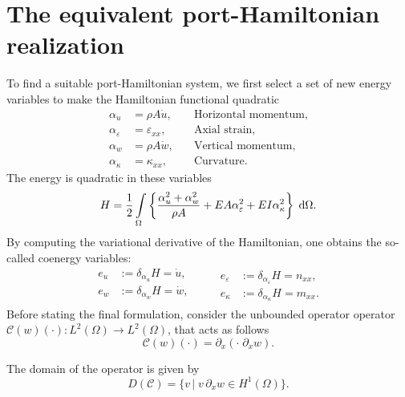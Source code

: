 \documentclass{ifacconf}
\begin{document}
\section{The equivalent port-Hamiltonian realization}\label{sec:pHmodel}
To find a suitable port-Hamiltonian system, we first select a set of new energy variables to make the Hamiltonian functional quadratic
\begin{equation}\label{eq:energies}
	\begin{aligned}
	\alpha_u &= \rho A \dot{u}, \quad &\text{Horizontal momentum},\\
	\alpha_\varepsilon &= \varepsilon_{xx}, \quad &\text{Axial strain}, \\
	\alpha_w &= \rho A \dot{w}, \quad &\text{Vertical momentum}, \\
	\alpha_\kappa &= \kappa_{xx}, \quad &\text{Curvature}.
	\end{aligned}
\end{equation}
The energy is quadratic in these variables
\begin{equation}
	H = \frac{1}{2} \int_{\Omega} \left\{\frac{\alpha_u^2 + \alpha_w^2}{\rho A} + EA \alpha_\varepsilon^2 + EI \alpha_\kappa^2 \right\} \d{\Omega}.
\end{equation}
By computing the variational derivative of the Hamiltonian, one obtains the so-called coenergy variables:
\begin{equation}\label{eq:coenergies}
	\begin{aligned}
	e_u &:= \delta_{\alpha_u} H = \dot{u}, \\
	e_w &:= \delta_{\alpha_w} H = \dot{w}, \\
	\end{aligned} \qquad 
\begin{aligned}
	e_\varepsilon &:= \delta_{\alpha_\varepsilon} H = n_{xx}, \\ e_\kappa &:= \delta_{\alpha_\kappa} H = m_{xx}.
\end{aligned}
\end{equation}
Before stating the final formulation, consider the unbounded operator operator $\mathcal{C}(w)(\cdot): L^2(\Omega) \rightarrow L^2(\Omega)$, that acts as follows
\begin{equation}
	\mathcal{C}(w)(\cdot ) = \partial_x(\cdot \; \partial_x w).
\end{equation}

The domain of the operator is given by
\begin{equation}
D(\mathcal{C}) = \{v \, \vert \; v \, \partial_x w \in H^1(\Omega) \}.
\end{equation}
\end{document}
